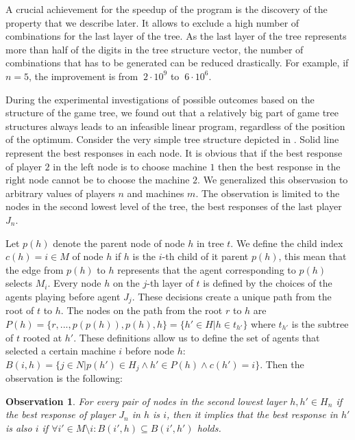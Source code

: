 \documentclass[runningheads]{llncs}
\newtheorem{observation}[lemma]{Observation}
\begin{document}
A crucial achievement for the speedup of the program is the discovery of
the property that we describe later. It allows to exclude a high
number of combinations for the last layer of the tree. As the last layer of the
tree represents more than half of the digits in the tree structure vector, the
number of combinations that has to be generated can be reduced drastically.
For example, if $n=5$, the improvement is from $~2\cdot 10^9$ to $~6\cdot 10^6$.

During the experimental investigations of possible outcomes based on the structure
of the game tree, we found out that a relatively big part of game tree structures
always leads to an infeasible linear program, regardless of the position of
the optimum. Consider the very simple tree structure depicted in . Solid line represent the best responses in each node.
It is obvious that if the best response of player $2$ in the left node is to choose machine $1$ then the best response in the right node cannot be to choose the machine $2$.
We generalized this observasion to arbitrary values of players $n$ and machines $m$. The observation is limited to the nodes in the second lowest level of the tree, the best responses of the last player $J_n$. 

Let $p(h)$ denote the parent node of node $h$ in tree $t$. We define the child index $c(h) = i \in M$ of node $h$ if $h$ is the $i$-th child of it parent $p(h)$, this mean that the edge from $p(h)$ to $h$ represents that the agent corresponding to $p(h)$ selects $M_i$. Every node $h$ on the $j$-th layer of $t$ is defined by the choices of the agents playing before agent $J_j$. These decisions create a unique path from the root of $t$ to $h$. The nodes on the path from the root $r$ to $h$ are $P(h) = \{r,...,p(p(h)), p(h), h\} = \{h'\in H|h \in t_{h'}\}$ where $t_{h'}$ is the subtree of $t$ rooted at $h'$. These definitions allow us to define the set of agents that selected a certain machine $i$ before node $h$: $B(i,h) = \{ j\in N |p(h')\in H_j  \land h'\in P(h) \land  c(h') =i\}$. Then the observation is the following: 

\begin{observation}
	For every pair of nodes in the second lowest layer $h,h'\in H_n$ if the best response of player $J_n$ in $h$ is $i$, then it implies that the best response in $h'$ is also $i$ if $\forall i' \in M\setminus i: B(i',h)\subseteq B(i',h')$ holds. 
\end{observation} 
\end{document}
